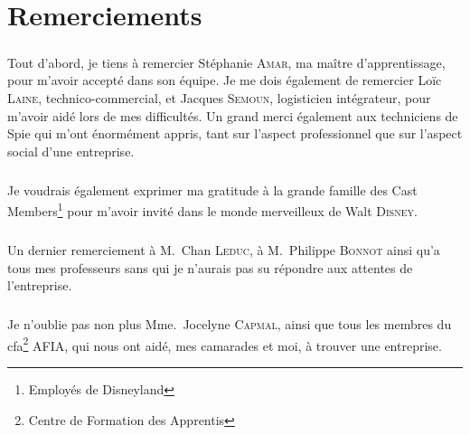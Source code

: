 \chapter*{Remerciements}

\paragraph{}
Tout d'abord, je tiens à remercier Stéphanie \textsc{Amar}, ma maître d'apprentissage, pour m'avoir accepté dans son équipe.
Je me dois également de remercier Loïc \textsc{Laine}, technico-commercial, et Jacques \textsc{Semoun}, logisticien intégrateur, pour m'avoir aidé lors de mes difficultés. 
Un grand merci également aux techniciens de Spie qui m'ont énormément appris, tant sur l'aspect professionnel que sur l'aspect social d'une entreprise.
\paragraph{}
Je voudrais également exprimer ma gratitude à la grande famille des \foreignlanguage{english}{Cast Members\footnote{Employés de Disneyland}} pour m'avoir invité dans le monde merveilleux de Walt \textsc{Disney}.
\paragraph{}
Un dernier remerciement à M.~Chan \textsc{Leduc}, à M.~Philippe \textsc{Bonnot} ainsi qu'a tous mes professeurs sans qui je n'aurais pas su répondre aux attentes de l'entreprise.
\paragraph{}
Je n'oublie pas non plus Mme.~Jocelyne \textsc{Capmal}, ainsi que tous les membres du \gls{cfa}\footnote{Centre de Formation des Apprentis} AFIA, qui nous ont aidé, mes camarades et moi, à trouver une entreprise.


